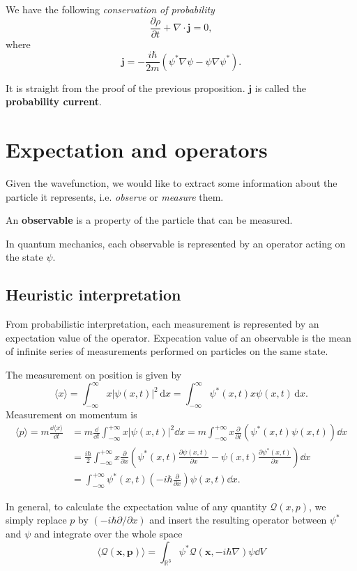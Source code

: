 \documentclass[a4paper]{article}
\begin{document}
\begin{proposition}
    We have the following \textit{conservation of probability}
    \[
    \frac{\partial \rho}{\partial t}+\nabla \cdot \mathbf{j}=0,
    \]
    where
    \[
    \mathbf{j}=-\frac{i \hbar}{2 m}\left(\psi^* \nabla \psi-\psi \nabla \psi^*\right).
    \]
\end{proposition}

It is straight from the proof of the previous proposition. $ \mathbf{j} $ is called the \textbf{probability current}. 

\section{Expectation and operators}

Given the wavefunction, we would like to extract some information about the particle it represents, i.e. \textit{observe} or \textit{measure} them. 
\begin{definition}
	An \textbf{observable} is a property of the particle that can be measured.
\end{definition}

In quantum mechanics, each observable is represented by an operator acting on the state \( \psi \).

\subsection{Heuristic interpretation}
From probabilistic interpretation, each measurement is represented by an expectation value of the operator. Expecation value of an observable is the mean of infinite series of measurements performed on particles on the same state. 
\begin{example}
    The measurement on position is given by 
    \[
    \langle x \rangle  = \int_{-\infty}^{\infty} x \left| \psi(x,t) \right| ^2 \,\mathrm{d}x = \int_{-\infty}^{\infty} \psi^*(x,t) x \psi(x,t) \,\mathrm{d}x.
    \]
    Measurement on momentum is 
    \[
        \begin{aligned}
            \langle p\rangle =m \frac{\dd\langle x\rangle}{\dd t}&=m \frac{\dd}{\dd t} \int_{-\infty}^{+\infty} x|\psi(x, t)|^2 \dd x=m \int_{-\infty}^{+\infty} x \frac{\partial}{\partial t}\left(\psi^*(x, t) \psi(x, t)\right) \dd x \\
            &=\frac{i \hbar}{2} \int_{-\infty}^{+\infty} x \frac{\partial}{\partial x}\left(\psi^*(x, t) \frac{\partial \psi(x, t)}{\partial x}-\psi(x, t) \frac{\partial \psi^*(x, t)}{\partial x}\right) \dd x\\ 
            &= \int_{-\infty}^{+\infty} \psi^*(x, t)\left(-i \hbar \frac{\partial}{\partial x}\right) \psi(x, t) \dd x.
        \end{aligned}
    \]
\end{example}
In general, to calculate the expectation value of any quantity $\mathcal{Q}(x, p)$, we simply replace $p$ by $(-i \hbar \partial / \partial x)$ and insert the resulting operator between $\psi^*$ and $\psi$ and integrate over the whole space
\[
\langle\mathcal{Q}(\mathbf{x}, \mathbf{p})\rangle=\int_{\mathbb{R}^3} \psi^* \mathcal{Q}(\mathbf{x},-i \hbar \nabla) \psi \dd V
\]
\end{document}
